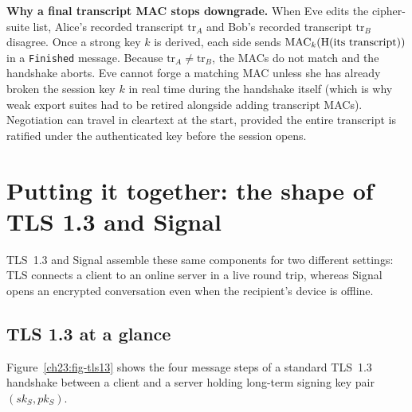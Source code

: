 \begin{whybox}
\textbf{Why a final transcript MAC stops downgrade.}
When Eve edits the cipher-suite list, Alice's recorded transcript $\mathrm{tr}_A$
and Bob's recorded transcript $\mathrm{tr}_B$ disagree. Once a strong key $k$ is
derived, each side sends $\operatorname{MAC}_k(\operatorname{H}(\text{its transcript}))$ in a
\texttt{Finished} message. Because $\mathrm{tr}_A \neq \mathrm{tr}_B$, the MACs
do not match and the handshake aborts. Eve cannot forge a matching MAC unless
she has already broken the session key $k$ in real time during the handshake
itself (which is why weak export suites had to be retired alongside adding
transcript MACs). Negotiation can travel in cleartext at the start, provided the
entire transcript is ratified under the authenticated key before the session
opens.
\end{whybox}

\section{Putting it together: the shape of TLS 1.3 and Signal}

TLS~1.3 and Signal assemble these same components for two different settings:
TLS connects a client to an online server in a live round trip, whereas Signal
opens an encrypted conversation even when the recipient's device is offline.

\subsection{TLS 1.3 at a glance}

Figure~\ref{ch23:fig-tls13} shows the four message steps of a standard TLS~1.3
handshake between a client and a server holding long-term signing key pair
$(sk_S, pk_S)$.


